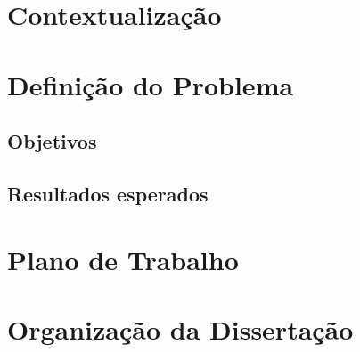 
\section{Contextualização}
\label{sec:Ch1.1}

\lipsum[1] %


\section{Definição do Problema}
\label{sec:Ch1.2}

\lipsum[2]


\subsection{Objetivos}
\label{sub:Ch1.2.1}

\lipsum[1]


\subsection{Resultados esperados}
\label{sub:Ch1.2.2}

\lipsum[2]


\section{Plano de Trabalho}
\label{sec:Ch1.3}

\lipsum[1]




\section{Organização da Dissertação}
\label{sec:Ch1.4}

\lipsum[2]



